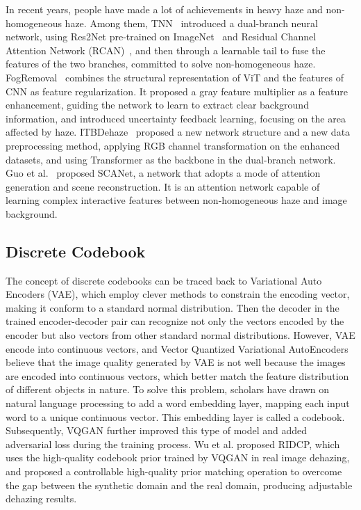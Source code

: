 \documentclass[lettersize,journal]{IEEEtran}
\begin{document}
In recent years, people have made a lot of achievements in heavy haze and non-homogeneous haze. Among them, TNN~\cite{yu2021two} introduced a dual-branch neural network, using Res2Net pre-trained on ImageNet~\cite{deng2009imagenet} and Residual Channel Attention Network (RCAN)~\cite{zhang2018image}, and then through a learnable tail to fuse the features of the two branches, committed to solve non-homogeneous haze. FogRemoval~\cite{jin2022structure} combines the structural representation of ViT\cite{dosovitskiy2020image} and the features of CNN as feature regularization. It proposed a gray feature multiplier as a feature enhancement, guiding the network to learn to extract clear background information, and introduced uncertainty feedback learning, focusing on the area affected by haze. ITBDehaze~\cite{liu2023data} proposed a new network structure and a new data preprocessing method, applying RGB channel transformation on the enhanced datasets, and using Transformer as the backbone in the dual-branch network. Guo et al.~\cite{guo2023scanet} proposed SCANet, a network that adopts a mode of attention generation and scene reconstruction. It is an attention network capable of learning complex interactive features between non-homogeneous haze and image background.

\subsection{Discrete Codebook}
The concept of discrete codebooks can be traced back to Variational Auto Encoders (VAE)\cite{kingma2013auto}, which employ clever methods to constrain the encoding vector, making it conform to a standard normal distribution. Then the decoder in the trained encoder-decoder pair can recognize not only the vectors encoded by the encoder but also vectors from other standard normal distributions. However, VAE encode into continuous vectors, and Vector Quantized Variational AutoEncoders\cite{van2017neural} believe that the image quality generated by VAE is not well because the images are encoded into continuous vectors, which better match the feature distribution of different objects in nature. To solve this problem, scholars have drawn on natural language processing to add a word embedding layer, mapping each input word to a unique continuous vector. This embedding layer is called a codebook. Subsequently, VQGAN\cite{esser2021taming} further improved this type of model and added adversarial loss during the training process. Wu et al.\cite{wu2023ridcp} proposed RIDCP, which uses the high-quality codebook prior trained by VQGAN in real image dehazing, and proposed a controllable high-quality prior matching operation to overcome the gap between the synthetic domain and the real domain, producing adjustable dehazing results.
\end{document}
